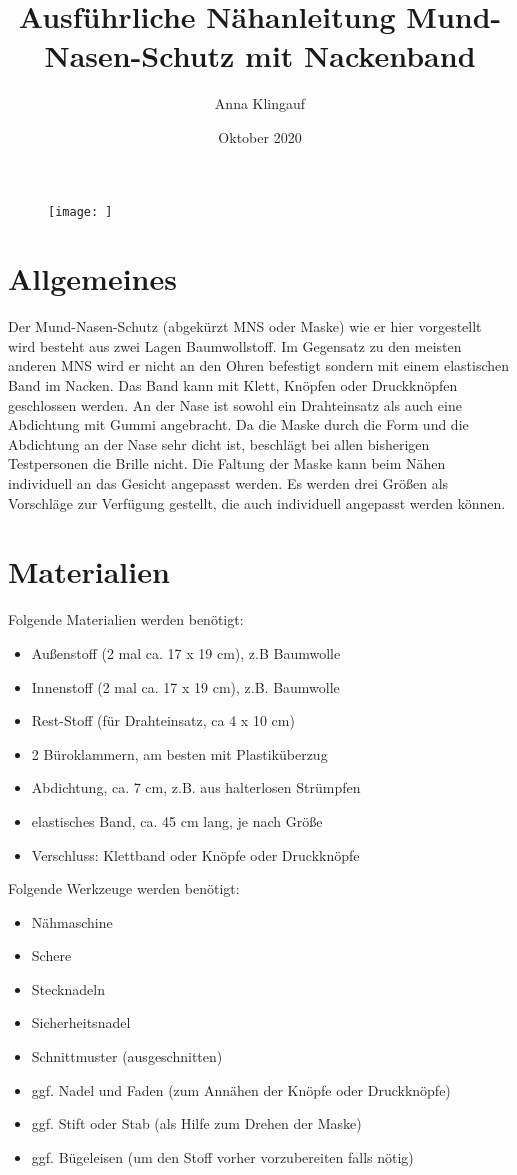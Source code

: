 \documentclass[12pt,parskip=full]{scrartcl}
\title{Ausführliche Nähanleitung Mund-Nasen-Schutz mit Nackenband}
\author{Anna Klingauf}
\date{Oktober 2020}
\begin{document}
\begin{titlepage}
\maketitle
\thispagestyle{empty}
\begin{figure}[b!] 
  \centering
     \texttt{[image: ]}
\end{figure}
\end{titlepage}
\clearpage

\section{Allgemeines}
Der Mund-Nasen-Schutz (abgekürzt MNS oder Maske) wie er hier vorgestellt wird besteht aus zwei Lagen Baumwollstoff. Im Gegensatz zu den meisten anderen MNS wird er nicht an den Ohren befestigt sondern mit einem elastischen Band im Nacken. Das Band kann mit Klett, Knöpfen oder Druckknöpfen geschlossen werden. An der Nase ist sowohl ein Drahteinsatz als auch eine Abdichtung mit Gummi angebracht. Da die Maske durch die Form und die Abdichtung an der Nase sehr dicht ist, beschlägt bei allen bisherigen Testpersonen die Brille nicht. Die Faltung der Maske kann beim Nähen individuell an das Gesicht angepasst werden. Es werden drei Größen als Vorschläge zur Verfügung gestellt, die auch individuell angepasst werden können.

\section{Materialien}
Folgende Materialien werden benötigt:
\begin{itemize}
    \item Außenstoff (2 mal ca. 17 x 19 cm), z.B Baumwolle
    \item Innenstoff (2 mal ca. 17 x 19 cm), z.B. Baumwolle
    \item Rest-Stoff (für Drahteinsatz, ca 4 x 10 cm)
    \item 2 Büroklammern, am besten mit Plastiküberzug
    \item Abdichtung, ca. 7 cm, z.B. aus halterlosen Strümpfen
    \item elastisches Band, ca. 45 cm lang, je nach Größe
    \item Verschluss: Klettband oder Knöpfe oder Druckknöpfe
\end{itemize}

Folgende Werkzeuge werden benötigt:
\begin{itemize}
    \item Nähmaschine
    \item Schere
    \item Stecknadeln
    \item Sicherheitsnadel
    \item Schnittmuster (ausgeschnitten)
    \item ggf. Nadel und Faden (zum Annähen der Knöpfe oder Druckknöpfe)
    \item ggf. Stift oder Stab (als Hilfe zum Drehen der Maske)
    \item ggf. Bügeleisen (um den Stoff vorher vorzubereiten falls nötig)
\end{itemize}
\end{document}
